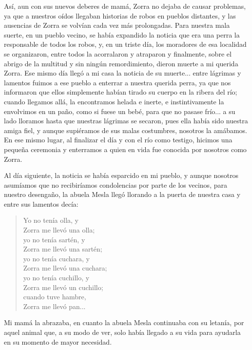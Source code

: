 Así, aun con sus nuevos deberes de mamá, Zorra no dejaba de causar problemas, ya que a nuestros oídos llegaban historias de robos en pueblos distantes, y las ausencias de Zorra se volvían cada vez más prolongadas.
Para nuestra mala suerte, en un pueblo vecino, se había expandido la noticia que era una perra la responsable de todos los robos, y, en un triste día, los moradores de esa localidad se organizaron, entre todos la acorralaron y atraparon y finalmente, sobre el abrigo de la multitud y sin ningún remordimiento, dieron muerte a mi querida Zorra. 
Ese mismo día llegó a mi casa la noticia de su muerte... entre lágrimas y lamentos fuimos a ese pueblo a enterrar a nuestra querida perra, ya que nos informaron que ellos simplemente habían tirado su cuerpo en la ribera del río; cuando llegamos allá, la encontramos helada e inerte, e instintivamente la envolvimos en un paño, como si fuese un bebé, para que no pasase frío... a su lado lloramos hasta que nuestras lágrimas se secaron, pues ella había sido nuestra amiga fiel, y aunque supiéramos de sus malas costumbres, nosotros la amábamos.
En ese mismo lugar, al finalizar el día y con el río como testigo, hicimos una pequeña ceremonia y enterramos a quien en vida fue conocida por nosotros como Zorra.

Al día siguiente, la noticia se había esparcido en mi pueblo, y aunque nosotros asumíamos que no recibiríamos condolencias por parte de los vecinos, para nuestro desengaño, la abuela Mesla llegó llorando a la puerta de nuestra casa y entre sus lamentos decía:
\begin{quotation}
\noindent Yo no tenía olla, y \\Zorra me llevó una olla;\\ 
yo no tenía sartén, y \\Zorra me llevó una sartén;\\ 
yo no tenía cuchara, y \\Zorra me llevó una cuchara;\\
yo no tenía cuchillo, y \\Zorra me llevó un cuchillo;\\
cuando tuve hambre, \\Zorra me llevó pan...  
\end{quotation}
Mi mamá la abrazaba, en cuanto la abuela Mesla continuaba con su letanía, por aquel animal que, a su modo de ver, solo había llegado a su vida para ayudarla en su momento de mayor necesidad.

